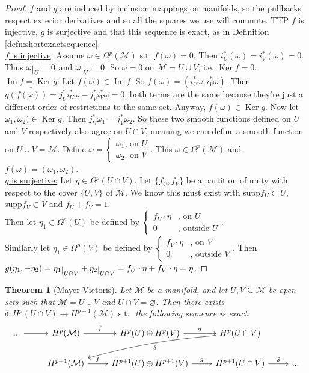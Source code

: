 \documentclass[10pt]{article}
\theoremstyle{plain}
\newtheorem{theorem}{Theorem}[section]
\theoremstyle{definition}
\newcommand{\st}{\text{ s.t. }}
\newcommand{\man}{\mathcal{M}}
\newcommand{\pformman}[1]{\Omega^{#1}(\man)}
\def\restrict#1{\raise-.5ex\hbox{\ensuremath|}_{#1}}
\DeclareMathOperator{\Ker}{Ker}
\DeclareMathOperator{\Ima}{Im}
\newcommand{\UintV}{U\cap V}
\begin{document}
\begin{proof}
$f$ and $g$ are induced by inclusion mappings on manifolds, so the pullbacks respect exterior derivatives and so all the squares we use will commute. TTP $f$ is injective, $g$ is surjective and that this sequence is exact, as in Definition \ref{defn:shortexactsequence}.\\
\underline{$f$ is injective}: Assume $\omega \in \pformman{p} \st f(\omega) = 0.$ Then $i_U^*(\omega) = i_V^*(\omega) = 0.$ Thus $\omega\restrict{U} =0 $ and $\omega \restrict{V} = 0$. So $\omega = 0$ on $\man = U\cup V$, i.e. $\Ker f = 0$.\\
$\underline{\Ima f = \Ker g}$: Let $f(\omega) \in \Ima f$. So $f(\omega) = (i_U^*\omega, i_V^*\omega).$ Then $g(f(\omega)) = j_U^* i_U^* \omega - j_V^*i_V^*\omega = 0 $; both terms are the same because they're just a different order of restrictions to the same set. Anyway, $f(\omega) \in \Ker g$. Now let $\omega_1,\omega_2)\in \Ker g.$ Then $j_U^* \omega_1 = j_V^* \omega_2$. So these two smooth functions defined on $U$ and $V$ respectively also agree on $\UintV$, meaning we can define a smooth function on $U\cup V = \man$. Define $\omega = \begin{cases} \omega_1 \text{, on } U \\ \omega_2  \text{, on }V \end{cases}$. This $\omega \in \pformman{p}$ and $f(\omega) = (\omega_1,\omega_2)$. \\
\underline{$g$ is surjective:} Let $\eta \in \Omega^p(\UintV).$ Let $\{f_U,f_V\}$ be a partition of unity with respect to the cover $\{U,V\}$ of $\man$. We know this must exist with supp$f_U \subset U$, supp$f_V\subset V$ and $f_U + f_V = 1$.\\
Then let $\eta_1\in \Omega^p(U)$ be defined by  $\begin{cases} f_U\cdot \eta &\text{, on } U \\ 0  &\text{, outside } U \end{cases}$.\\
Similarly let $\eta_1\in \Omega^p(V)$ be defined by  $\begin{cases} f_V\cdot \eta &\text{, on } V \\ 0  &\text{, outside } V \end{cases}$. Then $g(\eta_1 ,- \eta_2) = \eta_1 \restrict{\UintV} + \eta_2\restrict{\UintV} = f_U \cdot\eta + f_V \cdot \eta = \eta$.
\end{proof}
\begin{theorem}[Mayer-Vietoris]\label{thm:mayervietoris}
Let $\man$ be a manifold, and let $U,V\subseteq \man$ be open sets such that $\man = U \cup V$ and $\UintV = \varnothing$. Then there exists $\delta : H^p(\UintV) \to H^{p+1}(\man) \st$ the following sequence is exact:
$$\begin{tikzcd}
... \arrow[r] & H^p(\mathcal{M}) \arrow[r, "f"]     & H^p(U)\oplus H^p(V) \arrow[r, "g"]         & H^p(\UintV) \arrow[lld, "\delta",bend right = 5] &     \\
              & H^{p+1}(\mathcal{M}) \arrow[r, "f"] & H^{p+1}(U)\oplus H^{p+1}(V) \arrow[r, "g"] & H^{p+1}(\UintV) \arrow[r, "\delta"]                          & ...
\end{tikzcd}$$
\end{theorem}
\end{document}

